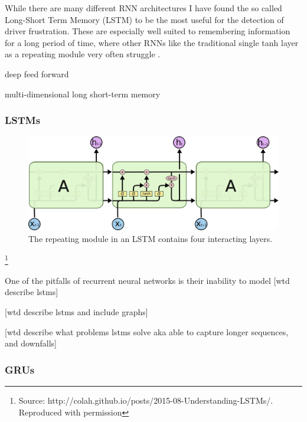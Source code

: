 While there are many different RNN architectures I have found the so called Long-Short Term Memory (LSTM) to be the most useful for the detection of driver frustration. %
These are especially well suited to remembering information for a long period of time, where other RNNs like the traditional single tanh layer as a repeating module very often struggle \cite{Hochreiter:1997:LSM:1246443.1246450}.




deep feed forward

multi-dimensional long short-term memory 




\subsubsection{LSTMs}

\begin{figure}[h]
    \centering
	\includegraphics[width=.8\textwidth]{./images/illustrations/LSTM3}
    \caption{The repeating module in an LSTM contains four interacting layers.}
    \label{fig:mesh1}
\end{figure}\footnote{Source: http://colah.github.io/posts/2015-08-Understanding-LSTMs/. Reproduced with permission}





One of the pitfalls of recurrent neural networks is their inability to model [wtd describe lstms]

[wtd describe lstms and include graphs]

[wtd describe what problems lstms solve aka able to capture longer sequences, and downfalls]

\subsubsection{GRUs}

